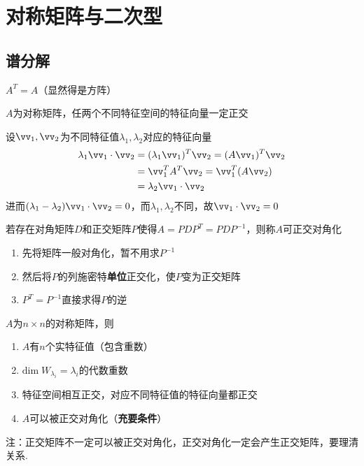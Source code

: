 
\section{对称矩阵与二次型}
\subsection{谱分解}
\begin{definition}[对称矩阵]
$A^T=A$（显然得是方阵）
\end{definition}
\begin{theorem}
$A$为对称矩阵，任两个不同特征空间的特征向量一定正交
\end{theorem}
\begin{analysis}
设$\vv_1,\vv_2$为不同特征值$\lambda_1,\lambda_2$对应的特征向量
\[\begin{aligned}\lambda_1\vv_1\cdot\vv_2&=(\lambda_1\vv_1)^T\vv_2=(A\vv_1)^T\vv_2\\
&=\vv_1^TA^T\vv_2=\vv_1^T(A\vv_2)\\
&=\lambda_2\vv_1\cdot\vv_2\end{aligned}\]
进而$(\lambda_1-\lambda_2)\vv_1\cdot\vv_2=0$，而$\lambda_1,\lambda_2$不同，故$\vv_1\cdot\vv_2=0$
\end{analysis}
\begin{definition}[正交对角化]
若存在对角矩阵$D$和正交矩阵$P$使得$A=PDP^T=PDP^{-1}$，则称$A$可正交对角化
\end{definition}
\begin{myalgorithm}[正交对角化]\mbox{}\par
\begin{enumerate}
	\itemsep -3pt
	\item 先将矩阵一般对角化，暂不用求$P^{-1}$
	\item 然后将$P$的列施密特\textbf{单位}正交化，使$P$变为正交矩阵
	\item $P^T=P^{-1}$直接求得$P$的逆
\end{enumerate}
\end{myalgorithm}
\begin{theorem}[谱定理]
$A$为$n\times n$的对称矩阵，则
\begin{enumerate}
	\itemsep -3pt
	\item $A$有$n$个实特征值（包含重数）
	\item $\mathrm{dim}\;W_{\lambda_i}=\lambda_i$的代数重数
	\item 特征空间相互正交，对应不同特征值的特征向量都正交
	\item $A$可以被正交对角化（\textbf{充要条件}）
\end{enumerate}
注：正交矩阵不一定可以被正交对角化，正交对角化一定会产生正交矩阵，要理清关系.
\end{theorem}

